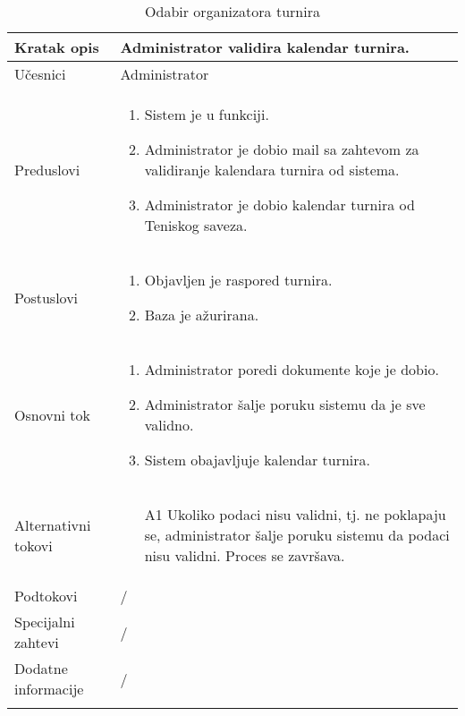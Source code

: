 \documentclass{article}
\begin{document}
    \begin{longtable}{| p{} | p{} |} 
        \hline
            Kratak opis & Administrator validira kalendar turnira.\\ 
        \hline    
            U\v{c}esnici & Administrator\\
        \hline
            Preduslovi & 
                \begin{enumerate}
                    \item Sistem je u funkciji.
                    \item Administrator je dobio mail sa zahtevom za validiranje kalendara turnira od sistema.
                    \item Administrator je dobio kalendar turnira od Teniskog saveza.
                \end{enumerate}\\
        \hline  
            Postuslovi & 
                \begin{enumerate}
                    \item Objavljen je raspored turnira.
                    \item Baza je ažurirana.
                \end{enumerate}\\
        \hline
            Osnovni tok & 
                \begin{enumerate}
                    \item Administrator poredi dokumente koje je dobio.
                    \item Administrator šalje poruku sistemu da je sve validno.
                    \item Sistem obajavljuje kalendar turnira.
                \end{enumerate}\\
        \hline
            Alternativni tokovi & 
                \begin{enumerate}
                    \item[A1] Ukoliko podaci nisu validni, tj. ne poklapaju se, administrator šalje poruku sistemu da podaci nisu validni. Proces se završava. 
                \end{enumerate}\\
        \hline
            Podtokovi & /\\
        \hline
            Specijalni zahtevi & /\\
        \hline
            Dodatne informacije & /\\
        \hline    
        \caption{Odabir organizatora turnira}
    \end{longtable}
\end{document}
